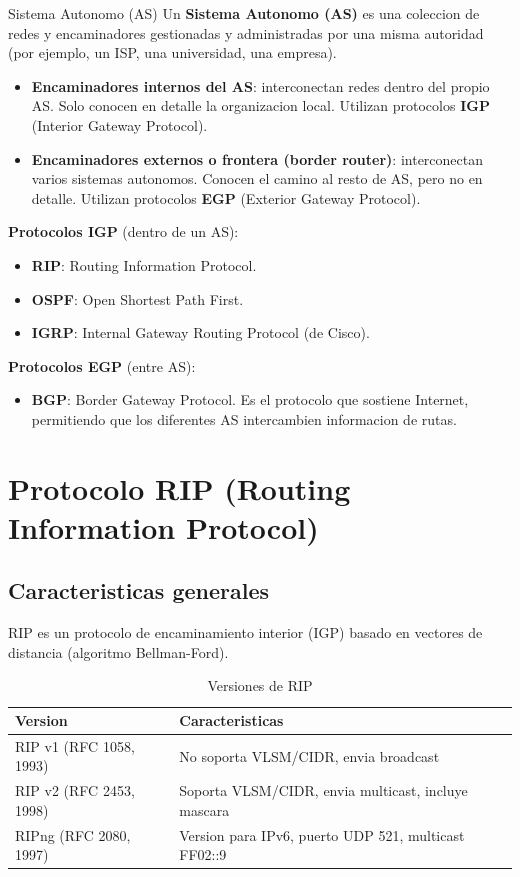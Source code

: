 \begin{definicion}{Sistema Autonomo (AS)}
Un \textbf{Sistema Autonomo (AS)} es una coleccion de redes y encaminadores
gestionadas y administradas por una misma autoridad (por ejemplo, un ISP, una
universidad, una empresa).
\end{definicion}

\begin{itemize}
    \item \textbf{Encaminadores internos del AS}: interconectan redes dentro del
    propio AS. Solo conocen en detalle la organizacion local. Utilizan protocolos
    \textbf{IGP} (Interior Gateway Protocol).
    \item \textbf{Encaminadores externos o frontera (border router)}: interconectan
    varios sistemas autonomos. Conocen el camino al resto de AS, pero no en
    detalle. Utilizan protocolos \textbf{EGP} (Exterior Gateway Protocol).
\end{itemize}

\textbf{Protocolos IGP} (dentro de un AS):
\begin{itemize}
    \item \textbf{RIP}: Routing Information Protocol.
    \item \textbf{OSPF}: Open Shortest Path First.
    \item \textbf{IGRP}: Internal Gateway Routing Protocol (de Cisco).
\end{itemize}

\textbf{Protocolos EGP} (entre AS):
\begin{itemize}
    \item \textbf{BGP}: Border Gateway Protocol. Es el protocolo que sostiene Internet,
    permitiendo que los diferentes AS intercambien informacion de rutas.
\end{itemize}


\section{Protocolo RIP (Routing Information Protocol)}

\subsection{Caracteristicas generales}

RIP es un protocolo de encaminamiento interior (IGP) basado en vectores de
distancia (algoritmo Bellman-Ford).

\begin{table}[htbp]
\centering
\small
\caption{Versiones de RIP}
\begin{tabularx}{\textwidth}{@{}l>{\raggedright\arraybackslash}X@{}}
\toprule
\textbf{Version} & \textbf{Caracteristicas} \\
\midrule
RIP v1 (RFC 1058, 1993) & No soporta VLSM/CIDR, envia broadcast \\
RIP v2 (RFC 2453, 1998) & Soporta VLSM/CIDR, envia multicast, incluye mascara \\
RIPng (RFC 2080, 1997) & Version para IPv6, puerto UDP 521, multicast FF02::9 \\
\bottomrule
\end{tabularx}
\end{table}

